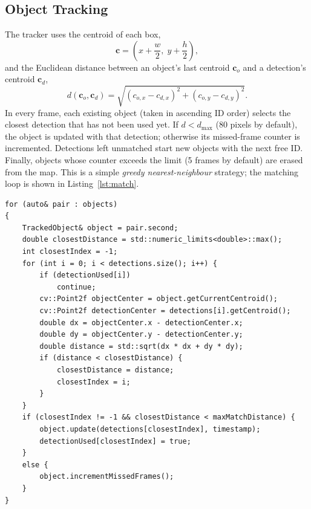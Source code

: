\documentclass[12pt,a4paper,oneside]{book}
\begin{document}
\subsection{Object Tracking}
The tracker uses the centroid of each box, 
\begin{equation}
\mathbf{c} = \left(x + \frac{w}{2},\; y + \frac{h}{2}\right),
\end{equation}
and the Euclidean distance between an object's last centroid $\mathbf{c}_o$ and a detection's centroid $\mathbf{c}_d$,
\begin{equation}
d(\mathbf{c}_o,\mathbf{c}_d) = \sqrt{(c_{o,x}-c_{d,x})^2 + (c_{o,y}-c_{d,y})^2}.
\end{equation}
In every frame, each existing object (taken in ascending ID order) selects the closest detection that has not been used yet. If $d < d_{\max}$ (80 pixels by default), the object is updated with that detection; otherwise its missed-frame counter is incremented. Detections left unmatched start new objects with the next free ID. Finally, objects whose counter exceeds the limit (5 frames by default) are erased from the map. This is a simple \emph{greedy nearest-neighbour} strategy; the matching loop is shown in Listing~\ref{lst:match}.

\begin{minipage}{\linewidth}
\begin{lstlisting}[caption={Matching loop of \texttt{ObjectTracker::update()}.}, label={lst:match}]
for (auto& pair : objects)
{
    TrackedObject& object = pair.second;
    double closestDistance = std::numeric_limits<double>::max();
    int closestIndex = -1;
    for (int i = 0; i < detections.size(); i++) {
        if (detectionUsed[i])
            continue;
        cv::Point2f objectCenter = object.getCurrentCentroid();
        cv::Point2f detectionCenter = detections[i].getCentroid();
        double dx = objectCenter.x - detectionCenter.x;
        double dy = objectCenter.y - detectionCenter.y;
        double distance = std::sqrt(dx * dx + dy * dy);
        if (distance < closestDistance) {
            closestDistance = distance;
            closestIndex = i;
        }
    }
    if (closestIndex != -1 && closestDistance < maxMatchDistance) {
        object.update(detections[closestIndex], timestamp);
        detectionUsed[closestIndex] = true;
    }
    else {
        object.incrementMissedFrames();
    }
}
\end{lstlisting}
\end{minipage}
\end{document}
